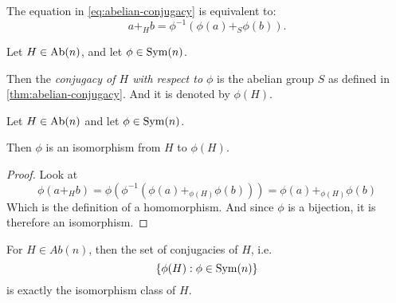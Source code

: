 \begin{remark}
    The equation in \autoref{eq:abelian-conjugacy} is equivalent to:
    \[
        a +_H b = \phi^{-1}(\phi(a) +_S \phi(b)).
    \]
\end{remark}

\begin{definition} \label{def:abelian-conjugacy}
    Let \( H \in \operatorname{Ab}(n) \), and let \( \phi \in \operatorname{Sym}(n) \).

    Then the \emph{conjugacy of \( H \) with respect to \( \phi \)} is the abelian group \( S \) as defined in \autoref{thm:abelian-conjugacy}. And it is denoted by \( \phi(H) \).
\end{definition}

\begin{theorem} \label{thm:conjugacy-isomorphism}
    Let \( H \in \operatorname{Ab}(n) \) and let \( \phi \in \operatorname{Sym}(n) \).

    Then \( \phi \) is an isomorphism from \( H \) to \( \phi(H) \).
\end{theorem}
\begin{proof}
    Look at
    \[
        \phi(a +_H b) = \phi(\phi^{-1}(\phi(a) +_{\phi(H)} \phi(b))) = \phi(a) +_{\phi(H)} \phi(b)
    \]
    Which is the definition of a homomorphism. And since \( \phi \) is a bijection, it is therefore an isomorphism.
\end{proof}

\begin{remark}
    For \( H \in Ab(n) \), then the set of conjugacies of \( H \), i.e. 
    \[
        \left\{ \phi(H) : \phi \in \operatorname{Sym}(n) \right\}
    \]
    is exactly the isomorphism class of \( H \).
\end{remark}

